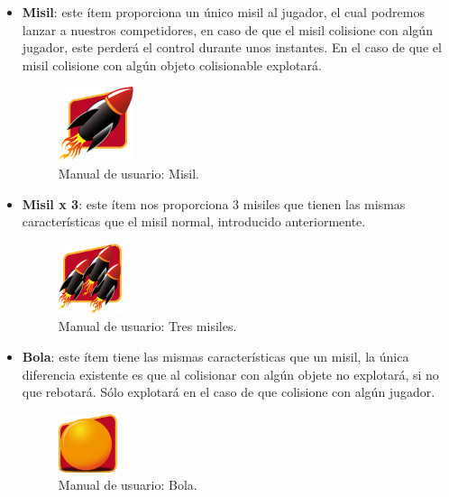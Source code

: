 \begin{itemize}
    \item \textbf{Misil}: este ítem proporciona un único misil al jugador, el cual podremos lanzar a nuestros competidores,
    en caso de que el misil colisione con algún jugador, este perderá el control durante unos instantes. En el caso de que el 
    misil colisione con algún objeto colisionable explotará.
        \begin{figure}[H]
          \label{misil}
          \begin{center}
            \includegraphics[scale=1]{imagenes/items/missile.png}
          \end{center}
         \caption{Manual de usuario: Misil.}
        \end{figure}
        
    \item \textbf{Misil x 3}: este ítem nos proporciona 3 misiles que tienen las mismas características que el misil normal, 
    introducido anteriormente.
        \begin{figure}[H]
          \label{tres_misiles}
          \begin{center}
            \includegraphics[scale=1]{imagenes/items/3missile.png}
          \end{center}
         \caption{Manual de usuario: Tres misiles.}
        \end{figure}
        
    \item \textbf{Bola}: este ítem tiene las mismas características que un misil, la única diferencia existente es que al 
    colisionar con algún objete no explotará, si no que rebotará. Sólo explotará en el caso de que colisione con algún
    jugador.        
        \begin{figure}[H]
          \label{bola}
          \begin{center}
            \includegraphics[scale=1]{imagenes/items/ball.png}
          \end{center}
         \caption{Manual de usuario: Bola.}
        \end{figure}
        

\end{itemize}
